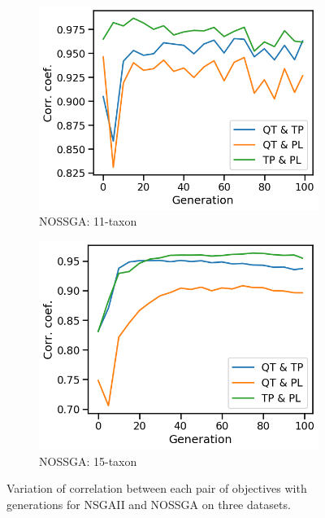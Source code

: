 \begin{figure}[!htbp]
\begin{adjustwidth}{-1cm}{-1cm}
\begin{subfigure}[b]{0.4\textwidth}
			\includegraphics[width=\textwidth]{Figure/11-taxon_NOSSGA_corr_plot}
			\caption{NOSSGA: 11-taxon}
		\end{subfigure}%
		\begin{subfigure}[b]{0.4\textwidth}
			\includegraphics[width=\textwidth]{Figure/15-taxon_NOSSGA_corr_plot}
			\caption{NOSSGA: 15-taxon}
		\end{subfigure}
		\caption{Variation of correlation between each pair of objectives with generations for NSGAII and NOSSGA on three datasets. 
		}
		\label{fig:gen_wise_correlation}
	\end{adjustwidth}
\end{figure}

